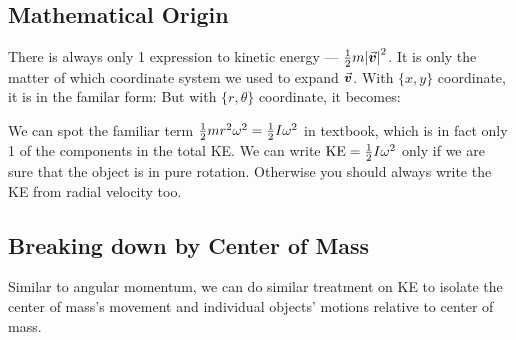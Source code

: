 \documentclass[class=article, crop=false, 12pt]{standalone}
\begin{document}
\subsection{Mathematical Origin}
There is always only 1 expression to kinetic energy --- $\frac{1}{2} m\abs{\va*{v}}^2$. 
It is only the matter of which coordinate system we used to expand $\va*{v}$. 
With $\{x,y\}$ coordinate, it is in the familar form:
But with $\{r,\theta\}$ coordinate, it becomes:

We can spot the familiar term $ \frac{1}{2} mr^2\omega^2 = \frac{1}{2} I\omega^2$ in textbook, which is in fact only 1 of the components in the total KE. 
We can write $\text{KE} =\frac{1}{2} I\omega^2$ only if we are sure that the object is in pure rotation. 
Otherwise you should always write the KE from radial velocity too.

\subsection{Breaking down by Center of Mass}

Similar to angular momentum, we can do similar treatment on KE to isolate the center of mass's movement and individual objects' motions relative to center of mass.

\end{document}
